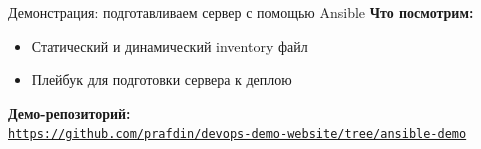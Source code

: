 \documentclass[aspectratio=169]{beamer}
\begin{document}
    \begin{frame}{Демонстрация: подготавливаем сервер с помощью Ansible}
        \textbf{Что посмотрим:}
        \begin{itemize}
            \item Статический и динамический inventory файл
            \item Плейбук для подготовки сервера к деплою
        \end{itemize}

        \vspace{0.2cm}
        \textbf{Демо-репозиторий:} \\
        \href{https://github.com/prafdin/devops-demo-website/tree/ansible-demo}{\texttt{https://github.com/prafdin/devops-demo-website/tree/ansible-demo}}
    \end{frame}
\end{document}
